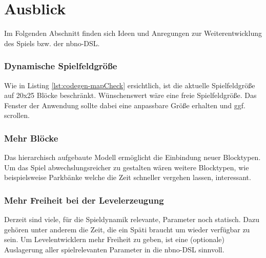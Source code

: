 \section{Ausblick}

Im Folgenden Abschnitt finden sich Ideen und Anregungen zur Weiterentwicklung des Spiels bzw. der nbno-DSL.

\subsubsection{Dynamische Spielfeldgröße}
Wie in Listing \ref{lst:codegen-mapCheck} ersichtlich, ist die aktuelle Spielfeldgröße auf 20x25 Blöcke beschränkt.
Wünschenswert wäre eine freie Spielfeldgröße.
Das Fenster der Anwendung sollte dabei eine anpassbare Größe erhalten und ggf. scrollen.

\subsubsection{Mehr Blöcke}
Das hierarchisch aufgebaute Modell ermöglicht die Einbindung neuer Blocktypen.
Um das Spiel abwechslungsreicher zu gestalten wären weitere Blocktypen, wie beispielsweise Parkbänke welche die Zeit schneller vergehen lassen, interessant.

\subsubsection{Mehr Freiheit bei der Levelerzeugung}
Derzeit sind viele, für die Spieldynamik relevante, Parameter noch statisch.
Dazu gehören unter anderem die Zeit, die ein Späti braucht um wieder verfügbar zu sein.
Um Levelentwicklern mehr Freiheit zu geben, ist eine (optionale) Auslagerung aller spielrelevanten Parameter in die nbno-DSL sinnvoll.